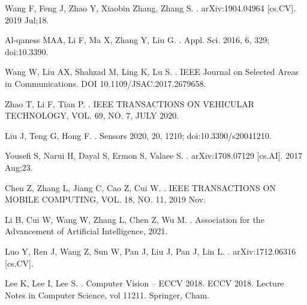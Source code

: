 \documentclass[10pt,letterpaper]{article}
\begin{document}
\begin{thebibliography}{10}
		
		
		Wang F, Feng J, Zhao Y, Xiaobin Zhang, Zhang S.
		.
		\newblock arXiv:1904.04964 [cs.CV]. 2019 Jul;18.
		
		
		Al-qaness MAA, Li F, Ma X, Zhang Y, Liu G.
		.
		\newblock Appl. Sci. 2016, 6, 329; doi:10.3390.
		
		Wang W, Liu AX, Shahzad M, Ling K, Lu S.
		.
		\newblock  IEEE Journal
		on Selected Areas in Communications. DOI 10.1109/JSAC.2017.2679658.
		
		Zhao T, Li F, Tian P.
		.
		\newblock IEEE TRANSACTIONS ON VEHICULAR TECHNOLOGY, VOL. 69, NO. 7, JULY 2020.
		
		Liu J, Teng G, Hong F.
		.
		\newblock Sensors 2020, 20, 1210; doi:10.3390/s20041210.
		
		Yousefi S, Narui H, Dayal S, Ermon S, Valaee S.
		.
		\newblock arXiv:1708.07129 [cs.AI]. 2017 Aug;23.
		
		Chen Z, Zhang L, Jiang C, Cao Z, Cui W.
		.
		\newblock  IEEE TRANSACTIONS ON MOBILE COMPUTING, VOL. 18, NO. 11, 2019 Nov.
		
		Li B, Cui W, Wang W, Zhang L, Chen Z, Wu M.
		.
		\newblock Association for the Advancement of Artificial
		Intelligence, 2021.
		
		Luo Y, Ren J, Wang Z, Sun W, Pan J, Liu J, Pan J, Lin L.
		.
		\newblock arXiv:1712.06316 [cs.CV].
		
		Lee K, Lee I, Lee S.
		.
		\newblock Computer Vision – ECCV 2018. ECCV 2018. Lecture Notes in Computer Science, vol 11211. Springer, Cham.
		

\end{thebibliography}
\end{document}

